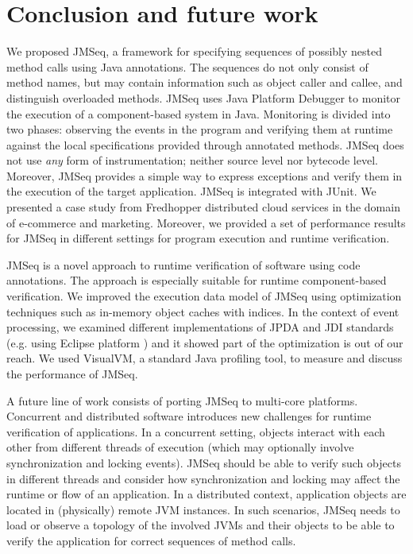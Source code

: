 \section{Conclusion and future work} \label{ch05:sec:conclusion}

We proposed JMSeq, a framework for specifying sequences of possibly nested method calls using Java annotations. 
The sequences do not only consist of method names, but may contain information such as object caller and callee, and distinguish overloaded methods. 
JMSeq uses Java Platform Debugger to monitor the execution of a component-based system in Java. 
Monitoring is divided into two phases: observing the events in the program and verifying them at runtime against the local specifications provided through annotated methods. 
JMSeq does not use \emph{any} form of instrumentation; neither source level nor bytecode level.
Moreover, JMSeq provides a simple way to express exceptions and verify them in the execution of the target application. JMSeq is integrated with JUnit.
We presented a case study from Fredhopper distributed cloud services in the domain of e-commerce and marketing. 
Moreover, we provided a set of performance results for JMSeq in different settings for program execution and runtime verification.

JMSeq is a novel approach to runtime verification of software using code annotations. 
The approach is especially suitable for runtime component-based verification. 
We improved the execution data model of JMSeq using optimization techniques such as in-memory object caches with indices.
In the context of event processing, we examined different implementations of JPDA and JDI standards (e.g. using Eclipse platform \cite{eclipse_debug_platform}) and it showed part of the optimization is out of our reach. 
We used VisualVM, a standard Java profiling tool, to measure and discuss the performance of JMSeq.

A future line of work consists of porting JMSeq to multi-core platforms. 
Concurrent and distributed software introduces new challenges for runtime verification of applications. 
In a concurrent setting, objects interact with each other from different threads of execution (which may optionally involve synchronization and locking events).
JMSeq should be able to verify such objects in different threads and consider how synchronization and locking may affect the runtime or flow of an application.
In a distributed context, application objects are located in (physically) remote JVM instances.
In such scenarios, JMSeq needs to load or observe a topology of the involved JVMs and their objects to be able to verify the application for correct sequences of method calls.

